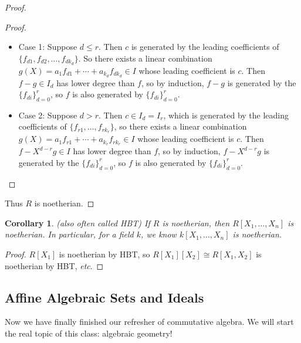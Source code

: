 \documentclass[12pt]{article}
\newcommand{\ita}[1]{\textit{#1}}
\newtheorem{corollary}[theorem]{Corollary}
\theoremstyle{definition}
\begin{document}
\begin{proof}
\begin{proof}
        \begin{itemize}
            \item Case 1: Suppose $d\leq r$. Then $c$ is generated by the leading coefficients of $\{f_{d1},f_{d2},\dotsc,f_{dk_d}\}$. So there exists a linear combination $g(X)=a_1f_{d1}+\dotsb+a_{k_d}f_{dk_d}\in I$ whose leading coefficient is $c$. Then $f-g\in I_d$ has lower degree than $f$, so by induction, $f-g$ is generated by the $\{f_{di}\}_{d=0}^r$, so $f$ is also generated by $\{f_{di}\}_{d=0}^r$. \checkmark
            \item Case 2: Suppose $d>r$. Then $c\in I_d=I_r$, which is generated by the leading coefficients of $\{f_{r1},\dotsc,f_{rk_r}\}$, so there exists a linear combination $g(X)=a_1f_{r1}+\dotsb+a_{k_r}f_{rk_r}\in I$ whose leading coefficient is $c$. Then $f-X^{d-r}g\in I$ has lower degree than $f$, so by induction, $f-X^{d-r}g$ is generated by the $\{f_{di}\}_{d=0}^r$, so $f$ is also generated by $\{f_{di}\}_{d=0}^r$. \checkmark
            \end{itemize}
    \end{proof}
    Thus $R$ is noetherian.
\end{proof}
\begin{corollary}
    (also often called HBT) If $R$ is noetherian, then $R[X_1,\dotsc,X_n]$ is noetherian. In particular, for a field $k$, we know $k[X_1,\dotsc,X_n]$ is noetherian.
\end{corollary}
\begin{proof}
    $R[X_1]$ is noetherian by HBT, so $R[X_1][X_2]\cong R[X_1,X_2]$ is noetherian by HBT, \ita{etc}.
\end{proof}
\subsection{Affine Algebraic Sets and Ideals}
Now we have finally finished our refresher of commutative algebra. We will start the real topic of this class: algebraic geometry!
\end{document}
